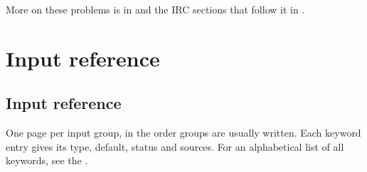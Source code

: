 \documentclass[letterpaper,10pt,english,openany,oneside]{sphinxmanual}
\begin{document}
\sphinxAtStartPar
More on these problems is in {\hyperref[\detokenize{troubleshooting/common-problems:troubleshooting-optimization}]{}} and the IRC sections that follow it in
{\hyperref[\detokenize{troubleshooting/common-problems::doc}]{}}.

\part{Input reference}

\sphinxstepscope




\chapter{Input reference}
\label{\detokenize{reference/index:input-reference}}\label{\detokenize{reference/index::doc}}
\sphinxAtStartPar
One page per input group, in the order groups are usually written. Each keyword entry gives its type, default, status and sources. For an alphabetical list of all keywords, see the .
\end{document}
